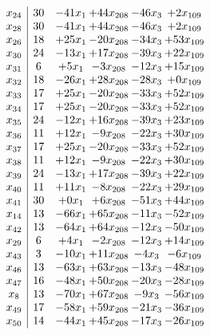 \documentclass[11pt]{article}
\begin{document}
\[\begin{array}{c| c c@{\hskip 2pt} c@{\hskip 2pt} c@{\hskip 2pt} c@{\hskip 2pt} }
 x_{24}   &  30 & -41 x_{1} & + 44 x_{208} & -46 x_{3} & + 2 x_{109}\\
 x_{28}   &  30 & -41 x_{1} & + 44 x_{208} & -46 x_{3} & + 2 x_{109}\\
 x_{26}   &  18 & + 25 x_{1} & -20 x_{208} & -34 x_{3} & + 53 x_{109}\\
 x_{30}   &  24 & -13 x_{1} & + 17 x_{208} & -39 x_{3} & + 22 x_{109}\\
 x_{31}   &  6 & + 5 x_{1} & -3 x_{208} & -12 x_{3} & + 15 x_{109}\\
 x_{32}   &  18 & -26 x_{1} & + 28 x_{208} & -28 x_{3} & + 0 x_{109}\\
 x_{33}   &  17 & + 25 x_{1} & -20 x_{208} & -33 x_{3} & + 52 x_{109}\\
 x_{34}   &  17 & + 25 x_{1} & -20 x_{208} & -33 x_{3} & + 52 x_{109}\\
 x_{35}   &  24 & -12 x_{1} & + 16 x_{208} & -39 x_{3} & + 23 x_{109}\\
 x_{36}   &  11 & + 12 x_{1} & -9 x_{208} & -22 x_{3} & + 30 x_{109}\\
 x_{37}   &  17 & + 25 x_{1} & -20 x_{208} & -33 x_{3} & + 52 x_{109}\\
 x_{38}   &  11 & + 12 x_{1} & -9 x_{208} & -22 x_{3} & + 30 x_{109}\\
 x_{39}   &  24 & -13 x_{1} & + 17 x_{208} & -39 x_{3} & + 22 x_{109}\\
 x_{40}   &  11 & + 11 x_{1} & -8 x_{208} & -22 x_{3} & + 29 x_{109}\\
 x_{41}   &  30 & + 0 x_{1} & + 6 x_{208} & -51 x_{3} & + 44 x_{109}\\
 x_{14}   &  13 & -66 x_{1} & + 65 x_{208} & -11 x_{3} & -52 x_{109}\\
 x_{42}   &  13 & -64 x_{1} & + 64 x_{208} & -12 x_{3} & -50 x_{109}\\
 x_{29}   &  6 & + 4 x_{1} & -2 x_{208} & -12 x_{3} & + 14 x_{109}\\
 x_{43}   &  3 & -10 x_{1} & + 11 x_{208} & -4 x_{3} & -6 x_{109}\\
 x_{46}   &  13 & -63 x_{1} & + 63 x_{208} & -13 x_{3} & -48 x_{109}\\
 x_{47}   &  16 & -48 x_{1} & + 50 x_{208} & -20 x_{3} & -28 x_{109}\\
 x_{8}   &  13 & -70 x_{1} & + 67 x_{208} & -9 x_{3} & -56 x_{109}\\
 x_{49}   &  17 & -58 x_{1} & + 59 x_{208} & -21 x_{3} & -36 x_{109}\\
 x_{50}   &  14 & -44 x_{1} & + 45 x_{208} & -17 x_{3} & -26 x_{109}\\

\end{array}\]
\end{document}
